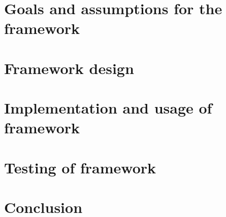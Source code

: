 \documentclass[12pt,twoside]{report}
\begin{document}



\tableofcontents



\chapter{Goals and assumptions for the framework}


\chapter{Framework design}


\chapter{Implementation and usage of framework}


\chapter{Testing of framework}


\chapter{Conclusion}


\printbibliography\
\end{document}
